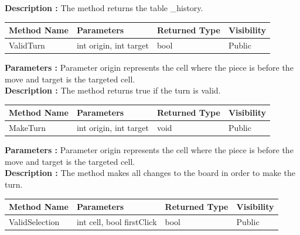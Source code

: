 \documentclass[12pt]{article}
\begin{document}
\textbf{Description :} The method returns the table \_history.

\begin{table}[H]
    \begin{tabular}{|l|l|l|l|}
    \hline
    \rowcolor[HTML]{EFEFEF} 
    \cellcolor[HTML]{EFEFEF}\textbf{Method Name} & \textbf{Parameters}    & \textbf{Returned Type} & \textbf{Visibility} \\ \hline
    ValidTurn                                    & int origin, int target & bool                   & Public              \\ \hline
    \end{tabular}
\end{table}

\textbf{Parameters :} Parameter origin represents the cell
where the piece is before the move and target is the targeted cell.
\\

\textbf{Description :} The method returns true if the turn is valid.

\begin{table}[H]
    \begin{tabular}{|l|l|l|l|}
    \hline
    \rowcolor[HTML]{EFEFEF} 
    \cellcolor[HTML]{EFEFEF}\textbf{Method Name} & \textbf{Parameters}    & \textbf{Returned Type} & \textbf{Visibility} \\ \hline
    MakeTurn                                     & int origin, int target & void                   & Public              \\ \hline
    \end{tabular}
\end{table}

\textbf{Parameters :} Parameter origin represents the cell
where the piece is before the move and target is the targeted cell.
\\

\textbf{Description :} The method makes all changes to the board in order to make the turn.

\begin{table}[H]
    \begin{tabular}{|l|l|l|l|}
    \hline
    \rowcolor[HTML]{EFEFEF} 
    \cellcolor[HTML]{EFEFEF}\textbf{Method Name} & \textbf{Parameters}       & \textbf{Returned Type} & \textbf{Visibility} \\ \hline
    ValidSelection                               & int cell, bool firstClick & bool                   & Public              \\ \hline
    \end{tabular}
\end{table}
\end{document}
